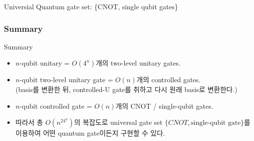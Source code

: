 \documentclass[9pt]{beamer}
\begin{document}
\begin{section}{Universial Quantum gate set: \{CNOT, single qubit gates\}}
\begin{frame}
        
        \end{frame}

        \begin{frame}
            \frametitle{Summary}
            \begin{block}{Summary}
                \begin{itemize}
                    \item $n$-qubit unitary = $O(4^n)$개의 two-level unitary gates.
                    \item $n$-qubit two-level unitary gate = $O(n)$개의 controlled gates.
                    \\(basis를 변환한 뒤, controlled-U gate를 취하고 다시 원래 basis로 변환한다.)
                    \item $n$-qubit controlled gate = $O(n)$개의 CNOT / single-qubit gates.
                    \item 따라서 총 $O(n^24^n)$의 복잡도로 universal gate set $\{CNOT, \text{single-qubit gate}\}$를 이용하여 어떤 quantum gate이든지 구현할 수 있다.
                \end{itemize}
            \end{block}
        
        \end{frame}
    \end{section}
    
\end{document}
